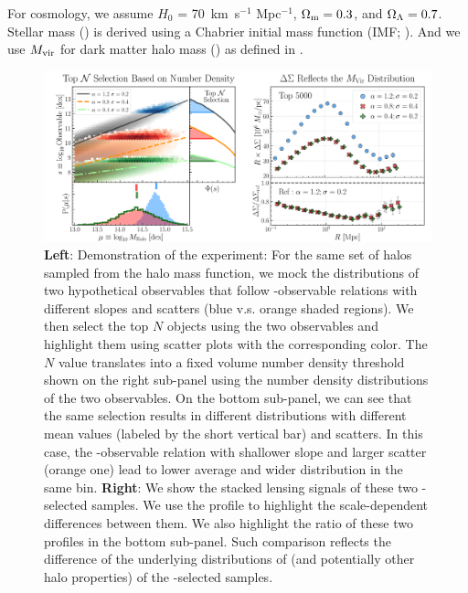 \documentclass[fleqn,usenatbib,useAMS,english]{mnras}
\begin{document}

    For cosmology, we assume $H_0$ = 70~km~s$^{-1}$ Mpc$^{-1}$,
    ${\Omega}_{\rm m}=0.3$, and ${\Omega}_{\rm \Lambda}=0.7$.
    Stellar mass (\mstar{}) is derived using a Chabrier initial mass function
    (IMF; \citealt{Chabrier2003}).
    And we use $M_{\rm vir}$ for dark matter halo mass (\mhalo{}) as
    defined in \citealt{BryanNorman1998}.

    \begin{figure}
    \includegraphics[width=\textwidth]{figure/topn_fig_1}
    \caption{
        \textbf{Left}:
            Demonstration of the \topn{} experiment: For the same set of halos sampled from the
             halo mass function, we mock the distributions of two hypothetical observables
            that follow \mhalo{}-observable relations with different slopes and scatters
            (blue v.s. orange shaded regions).
            We then select the top $N$ objects using the two observables and highlight them using
            scatter plots with the corresponding color.
            The $N$ value translates into a fixed volume number density threshold shown on the
            right sub-panel using the number density distributions of the two observables.
            On the bottom sub-panel, we can see that the same \topn{} selection results in
            different \mhalo{} distributions with different mean values (labeled by the short
            vertical bar) and scatters. 
            In this case, the \mhalo{}-observable relation with shallower slope and larger scatter
            (orange one) lead to lower average \mhalo{} and wider \mhalo{} distribution in the same
            \topn{} bin.
        \textbf{Right}:
            We show the stacked lensing signals of these two \topn{}-selected samples.
            We use the \rdsigma{} profile to highlight the scale-dependent differences between them.
            We also highlight the ratio of these two profiles in the bottom sub-panel.
            Such comparison reflects the difference of the underlying distributions of \mhalo{}
            (and potentially other halo properties) of the \topn{}-selected samples.
        }
        \label{fig:theory_1}
    \end{figure}
\end{document}
